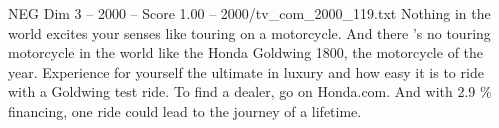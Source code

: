 \begin{textsample}{NEG Dim 3 – 2000 – Score 1.00 – 2000/tv\_com\_2000\_119.txt}  \label{ex:f3_neg_009}
Nothing in the world excites your senses like touring on a motorcycle.
And there 's no touring motorcycle in the world like the Honda Goldwing 1800, the motorcycle of the year.
Experience for yourself the ultimate in luxury and how easy it is to ride with a Goldwing test ride.
To find a dealer, go on Honda.com.
And with 2.9 \% financing, one ride could lead to the journey of a lifetime.

\end{textsample}
